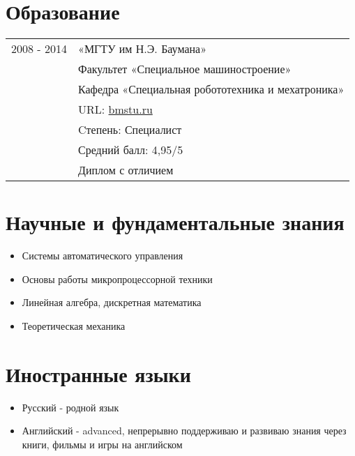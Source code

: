 \documentclass[a4paper, 11pt]{article}
\begin{document}
\section{Образование}
\begin{tabular}{p{25mm}|p{110mm}}
2008 - 2014         & «МГТУ им Н.Э. Баумана»                            \\
                    & Факультет «Специальное машиностроение»            \\
                    & Кафедра «Специальная робототехника и мехатроника» \\
                    & URL: \href{http://bmstu.ru}{bmstu.ru}             \\
                    & Cтепень: Специалист                               \\
                    & Средний балл: 4,95/5                              \\
                    & Диплом с отличием
\end{tabular}

\section{Научные и фундаментальные знания}
\begin{itemize}
    \item Системы автоматического управления
    \item Основы работы микропроцессорной техники
    \item Линейная алгебра, дискретная математика
    \item Теоретическая механика
\end{itemize}

\section{Иностранные языки}
\begin{itemize}
    \item   Русский    - родной язык
    \item   Английский - advanced, непрерывно поддерживаю и развиваю знания через
            книги, фильмы и игры на английском
\end{itemize}
\end{document}
